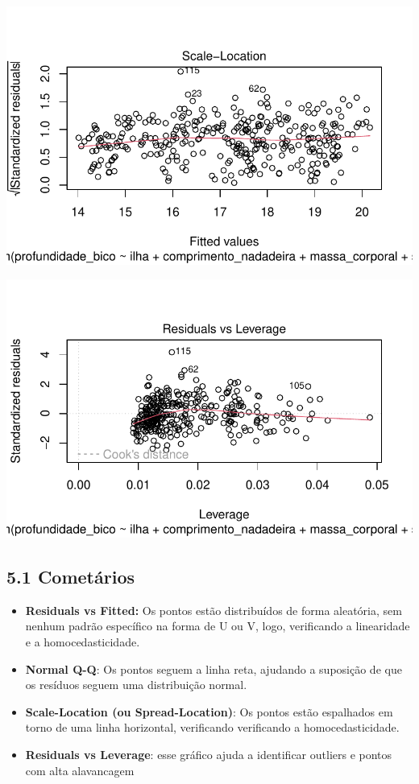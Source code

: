 \documentclass[
  letterpaper,
  DIV=11,
  numbers=noendperiod]{scrartcl}
\begin{document}
\includegraphics{r_files/figure-pdf/unnamed-chunk-14-3.pdf}

\includegraphics{r_files/figure-pdf/unnamed-chunk-14-4.pdf}

\subsection{5.1 Cometários}\label{cometuxe1rios}

\begin{itemize}
\item
  \textbf{Residuals vs Fitted:} Os pontos estão distribuídos de forma
  aleatória, sem nenhum padrão específico na forma de U ou V, logo,
  verificando a linearidade e a homocedasticidade.
\item
  \textbf{Normal Q-Q}: Os pontos seguem a linha reta, ajudando a
  suposição de que os resíduos seguem uma distribuição normal.
\item
  \textbf{Scale-Location (ou Spread-Location)}: Os pontos estão
  espalhados em torno de uma linha horizontal, verificando verificando a
  homocedasticidade.
\item
  \textbf{Residuals vs Leverage}: esse gráfico ajuda a identificar
  outliers e pontos com alta alavancagem
\end{itemize}
\end{document}
